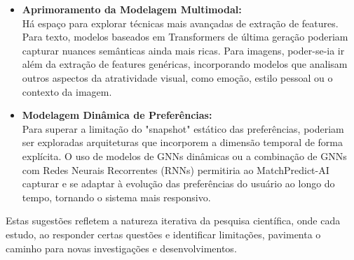 \begin{itemize}
    \item \textbf{Aprimoramento da Modelagem Multimodal:}
    \\ Há espaço para explorar técnicas mais avançadas de extração de features. Para texto, modelos baseados em Transformers de última geração poderiam capturar nuances semânticas ainda mais ricas. Para imagens, poder-se-ia ir além da extração de features genéricas, incorporando modelos que analisam outros aspectos da atratividade visual, como emoção, estilo pessoal ou o contexto da imagem.
    
    \item \textbf{Modelagem Dinâmica de Preferências:}
    \\ Para superar a limitação do "snapshot" estático das preferências, poderiam ser exploradas arquiteturas que incorporem a dimensão temporal de forma explícita. O uso de modelos de GNNs dinâmicas ou a combinação de GNNs com Redes Neurais Recorrentes (RNNs) permitiria ao MatchPredict-AI capturar e se adaptar à evolução das preferências do usuário ao longo do tempo, tornando o sistema mais responsivo.
\end{itemize}
Estas sugestões refletem a natureza iterativa da pesquisa científica, onde cada estudo, ao responder certas questões e identificar limitações, pavimenta o caminho para novas investigações e desenvolvimentos.